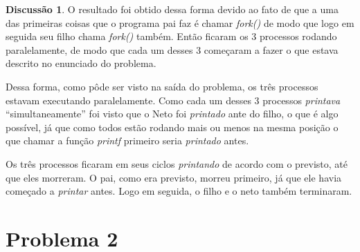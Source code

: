\documentclass[a4paper, 8pt]{article}
\theoremstyle{plain}
\theoremstyle{plain}
\theoremstyle{definition}
\newtheorem{discussion}{Discussão}
\theoremstyle{definition}
\begin{document}
\begin{multicols}{2}





\begin{discussion}
\label{dicussionproblem1}
O resultado foi obtido dessa forma devido ao fato de que a uma das primeiras coisas que o programa pai faz é chamar \textit{fork()} de modo que logo em seguida seu filho chama \textit{fork()} também. Então ficaram os 3 processos rodando paralelamente, de modo que cada um desses 3 começaram a fazer o que estava descrito no enunciado do problema.

Dessa forma, como pôde ser visto na saída do problema, os três processos estavam executando paralelamente. Como cada um desses 3 processos \textit{printava} ``simultaneamente'' foi visto que o Neto foi \textit{printado} ante do filho, o que é algo possível, já que como todos estão rodando mais ou menos na mesma posição o que chamar a função \textit{printf} primeiro seria \textit{printado} antes.

Os três processos ficaram em seus ciclos \textit{printando} de acordo com o previsto, até que eles morreram. O pai, como era previsto, morreu primeiro, já que ele havia começado a \textit{printar} antes. Logo em seguida, o filho e o neto também terminaram.
\end{discussion}


\section*{Problema  2}


\end{multicols}
\end{document}
